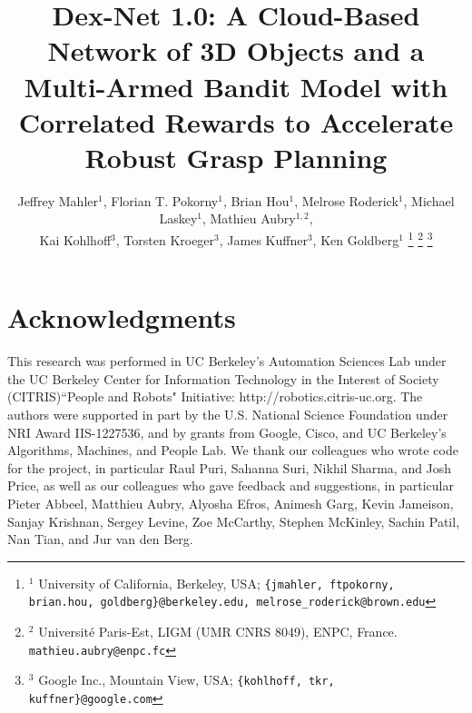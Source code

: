 \documentclass[letterpaper, 10 pt, conference]{ieeeconf}  %
\begin{document}
\title{\LARGE \bf Dex-Net 1.0: A Cloud-Based Network of 3D Objects and a Multi-Armed Bandit Model with Correlated Rewards to Accelerate Robust Grasp Planning
	}
\author{Jeffrey Mahler$^1$, Florian T. Pokorny$^1$, Brian Hou$^1$, Melrose Roderick$^1$, Michael Laskey$^1$, Mathieu Aubry$^{1,2}$, \\
Kai Kohlhoff$^3$, Torsten Kroeger$^3$, James Kuffner$^3$, Ken Goldberg$^{1}$
\thanks{{\small $^1$ University of California, Berkeley, USA; {\tt\small \{jmahler, ftpokorny, brian.hou, goldberg\}@berkeley.edu, melrose\_roderick@brown.edu}}}%
\thanks{{\small $^2$ Universit\'e Paris-Est, LIGM (UMR CNRS 8049), ENPC, France. {\tt\small mathieu.aubry@enpc.fc}}}%
\thanks{{\small $^3$ Google Inc., Mountain View, USA; {\tt\small \{kohlhoff, tkr, kuffner\}@google.com}} }
}
\maketitle


%


%


%




%

\section{Acknowledgments}
{\small
This research was performed in UC Berkeley's Automation Sciences Lab under the UC Berkeley Center for Information Technology in the Interest of Society (CITRIS)``People and Robots" Initiative: http://robotics.citris-uc.org.
The authors were supported in part by the U.S. National Science Foundation under NRI Award IIS-1227536, and by grants from Google, Cisco, and UC Berkeley's Algorithms, Machines, and People Lab.
We thank our colleagues who wrote code for the project, in particular Raul Puri, Sahanna Suri, Nikhil Sharma, and Josh Price, as well as our colleagues who gave feedback and suggestions, in particular Pieter Abbeel, Matthieu Aubry, Alyosha Efros, Animesh Garg, Kevin Jameison, Sanjay Krishnan, Sergey Levine, Zoe McCarthy, Stephen McKinley, Sachin Patil, Nan Tian, and Jur van den Berg.
}



\end{document}
